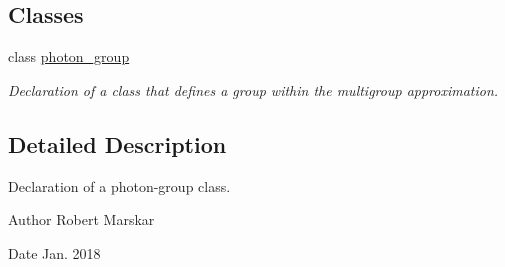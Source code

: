 \subsection*{Classes}
\begin{DoxyCompactItemize}
\item 
class \hyperlink{classphoton__group}{photon\+\_\+group}
\begin{DoxyCompactList}\small\item\em Declaration of a class that defines a group within the multigroup approximation. \end{DoxyCompactList}\end{DoxyCompactItemize}


\subsection{Detailed Description}
Declaration of a photon-\/group class. 

\begin{DoxyAuthor}{Author}
Robert Marskar 
\end{DoxyAuthor}
\begin{DoxyDate}{Date}
Jan. 2018 
\end{DoxyDate}

